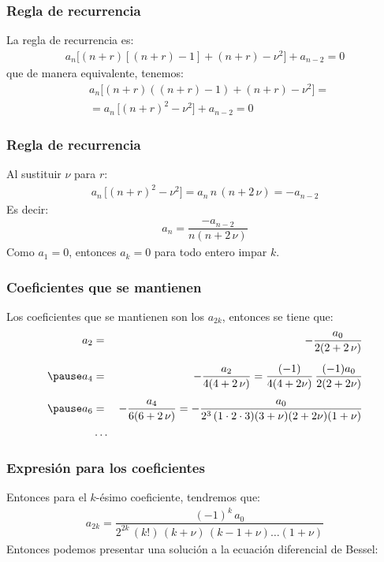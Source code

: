 \documentclass[12pt]{beamer}
\begin{document}
\begin{frame}
\frametitle{Regla de recurrencia}
La regla de recurrencia es:
\pause
\begin{align*}
a_{n} \big[ (n + r) \left[ (n + r) - 1 \right] + (n + r) - \nu^{2} \big] + a_{n-2} = 0
\end{align*}
\pause
que de manera equivalente, tenemos:
\pause
\begin{align*}
&a_{n} \big[ (n + r) \left( (n + r) - 1 \right) + (n + r) - \nu^{2} \big] = \\[0.5em]
&= a_{n} \, \big[ (n + r)^{2} - \nu^{2} \big] + a_{n-2} = 0
\end{align*}
\end{frame}
\begin{frame}
\frametitle{Regla de recurrencia}
Al sustituir $\nu$ para $r$:
\pause
\begin{align*}
a_{n} \, \big[ (n + r)^{2} - \nu^{2} \big] = a_{n} \, n \, (n + 2 \, \nu) = - a_{n-2}
\end{align*}
\pause
Es decir:
\pause
\begin{align*}
a_{n} = \dfrac{- a_{n-2}}{n (n + 2 \, \nu)}
\end{align*}
Como $a_{1} = 0$, entonces $a_{k} = 0$ para todo entero impar $k$.
\end{frame}
\begin{frame}
\frametitle{Coeficientes que se mantienen}
Los coeficientes que se mantienen son los $a_{2 k}$, entonces se tiene que:
\pause
\fontsize{12}{12}\selectfont
\begin{eqnarray*}
a_{2} &=& - \dfrac{a_{0}}{2 (2 + 2 \, \nu)} \\[0.5em]\pause
a_{4} &=& - \dfrac{a_{2}}{4 (4 + 2 \, \nu)} = \dfrac{(-1)}{4 (4 + 2 \nu)} \, \dfrac{(-1)a_{0}}{2 (2 + 2 \nu)} \\[0.5em]\pause
a_{6} &=& - \dfrac{a_{4}}{6 (6 + 2 \, \nu)} = - \dfrac{a_{0}}{2^{3} \, (1 \cdot 2 \cdot 3) (3 + \nu)(2 + 2 \nu)(1 + \nu)}\\
&\ldots&
\end{eqnarray*}
\end{frame}
\begin{frame}
\frametitle{Expresión para los coeficientes}
Entonces para el $k$-ésimo coeficiente, tendremos que:
\pause
\begin{align*}
a_{2k} = \dfrac{(-1)^{k} \, a_{0}}{2^{2 k} \, (k!) \, (k + \nu) \, (k - 1 + \nu) \ldots (1 + \nu)}
\end{align*}
\pause
Entonces podemos presentar una solución a la ecuación diferencial de Bessel:
\end{frame}
\end{document}
